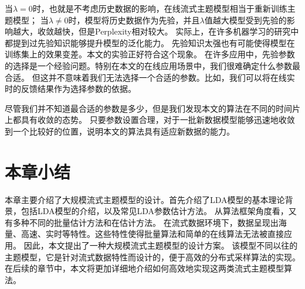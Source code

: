 当$\lambda = 0$时，也就是不考虑历史数据的影响，在线流式主题模型相当于重新训练主题模型；
当$\lambda \ne 0 $时，模型将历史数据作为先验，并且$\lambda$值越大模型受到先验的影响越大，收敛越快，但是Perplexity相对较大。
实际上，在许多机器学习的研究中都提到过先验知识能够提升模型的泛化能力。
先验知识太强也有可能使得模型在训练集上的效果变差。本文的实验正好符合这个现象。
在许多应用中，先验参数的选择是一个经验问题。特别在本文的在线应用场景中，我们很难确定什么参数最合适。
但这并不意味着我们无法选择一个合适的参数。比如，我们可以将在线实时的反馈结果作为选择参数的依据。

尽管我们并不知道最合适的参数是多少，但是我们发现本文的算法在不同的时间片上都具有收敛的态势。
只要参数设置合理，对于一批新数据模型能够迅速地收敛到一个比较好的位置，说明本文的算法具有适应新数据的能力。

\section{本章小结}
本章主要介绍了大规模流式主题模型的设计。首先介绍了LDA模型的基本理论背景，包括LDA模型的介绍，以及常见LDA参数估计方法。
从算法框架角度看，又有多种不同的批量估计方法和在估计方法。
在流式数据环境下，数据呈现出海量、高速、实时等特性。这些特性使得批量算法和简单的在线算法无法被直接应用。
因此，本文提出了一种大规模流式主题模型的设计方案。
该模型不同以往的主题模型，它是针对流式数据特性而设计的，便于高效的分布式采样算法的实现。
在后续的章节中，本文将更加详细地介绍如何高效地实现这两类流式主题模型算法。
